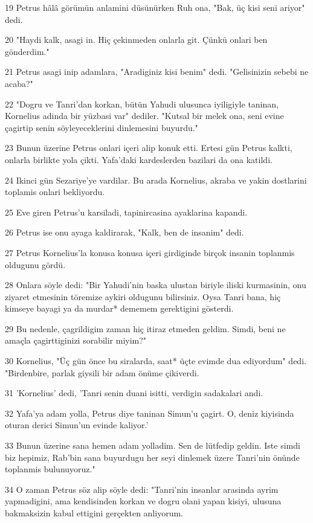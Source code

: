 \par 19 Petrus hâlâ görümün anlamini düsünürken Ruh ona, "Bak, üç kisi seni ariyor" dedi.
\par 20 "Haydi kalk, asagi in. Hiç çekinmeden onlarla git. Çünkü onlari ben gönderdim."
\par 21 Petrus asagi inip adamlara, "Aradiginiz kisi benim" dedi. "Gelisinizin sebebi ne acaba?"
\par 22 "Dogru ve Tanri'dan korkan, bütün Yahudi ulusunca iyiligiyle taninan, Kornelius adinda bir yüzbasi var" dediler. "Kutsal bir melek ona, seni evine çagirtip senin söyleyeceklerini dinlemesini buyurdu."
\par 23 Bunun üzerine Petrus onlari içeri alip konuk etti. Ertesi gün Petrus kalkti, onlarla birlikte yola çikti. Yafa'daki kardeslerden bazilari da ona katildi.
\par 24 Ikinci gün Sezariye'ye vardilar. Bu arada Kornelius, akraba ve yakin dostlarini toplamis onlari bekliyordu.
\par 25 Eve giren Petrus'u karsiladi, tapinircasina ayaklarina kapandi.
\par 26 Petrus ise onu ayaga kaldirarak, "Kalk, ben de insanim" dedi.
\par 27 Petrus Kornelius'la konusa konusa içeri girdiginde birçok insanin toplanmis oldugunu gördü.
\par 28 Onlara söyle dedi: "Bir Yahudi'nin baska ulustan biriyle iliski kurmasinin, onu ziyaret etmesinin töremize aykiri oldugunu bilirsiniz. Oysa Tanri bana, hiç kimseye bayagi ya da murdar* dememem gerektigini gösterdi.
\par 29 Bu nedenle, çagrildigim zaman hiç itiraz etmeden geldim. Simdi, beni ne amaçla çagirttiginizi sorabilir miyim?"
\par 30 Kornelius, "Üç gün önce bu siralarda, saat* üçte evimde dua ediyordum" dedi. "Birdenbire, parlak giysili bir adam önüme çikiverdi.
\par 31 'Kornelius' dedi, 'Tanri senin duani isitti, verdigin sadakalari andi.
\par 32 Yafa'ya adam yolla, Petrus diye taninan Simun'u çagirt. O, deniz kiyisinda oturan derici Simun'un evinde kaliyor.'
\par 33 Bunun üzerine sana hemen adam yolladim. Sen de lütfedip geldin. Iste simdi biz hepimiz, Rab'bin sana buyurdugu her seyi dinlemek üzere Tanri'nin önünde toplanmis bulunuyoruz."
\par 34 O zaman Petrus söz alip söyle dedi: "Tanri'nin insanlar arasinda ayrim yapmadigini, ama kendisinden korkan ve dogru olani yapan kisiyi, ulusuna bakmaksizin kabul ettigini gerçekten anliyorum.
